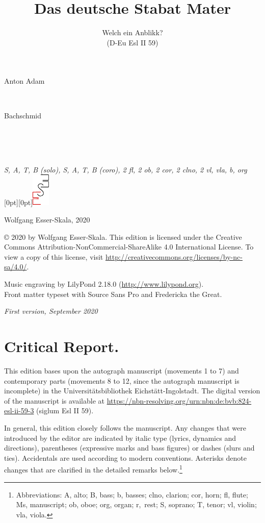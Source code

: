 \documentclass[parskip=full]{scrreprt}
\makeatletter
\DeclareRobustCommand{\sbseries}{\fontseries{sb}\selectfont}
\newcommand\fancytitlehead{
	\headingfont%
	\fontsize{80}{80}\selectfont\textcolor{black!80}{\@ifundefined{@shortname}{\@lastname}{\@shortname}.}\\[15pt]%
	\fontsize{60}{60}\selectfont\@ifundefined{@shorttitle}{\@title}{\@shorttitle}.%
}
\def\firstname#1{\def\@firstname{#1}}
\def\lastname#1{\def\@lastname{#1}}
\def\shorttitle#1{\def\@shorttitle{#1}}
\def\instrumentation#1{\def\@instrumentation{#1}}
\def\maketitle{%
\begin{titlepage}%
	\Large%
	{\@titlehead}%
	\vfill%
	{\strut\@firstname}\\%
	{\sbseries\color{oldred}\strut\@lastname}\\%
	{\strut\@namesuffix}%
	\vfill%
	{\sbseries\@title}\\%
	{\@subtitle}\\[\baselineskip]%
	{\itshape\@instrumentation}%
	\vfill%
	{\itshape\@parts}\hspace*{\fill}\raisebox{0pt}[0pt][0pt]{\includegraphics{ees_logo}}%
\end{titlepage}%
}
\newif\ifprintreport\printreportfalse
\makeatother
\begin{document}
\frenchspacing

\titlehead{\fancytitlehead}
\firstname{Anton Adam}
\lastname{Bachschmid}
\title{Das deutsche Stabat Mater}
\shorttitle{Stabat Mater}
\subtitle{Welch ein Anblikk?\\(D-Eu Esl II 59)}
\instrumentation{S, A, T, B (solo), S, A, T, B (coro), 2 fl, 2 ob, 2 cor, 2 clno, 2 vl, vla, b, org}
\maketitle


\thispagestyle{empty}

\vspace*{\fill}

\hspace*{1em}Wolfgang Esser-Skala, 2020

© 2020 by Wolfgang Esser-Skala. This edition is licensed under the Creative Commons Attribution-NonCommercial-ShareAlike 4.0 International License. To view a copy of this license, visit \url{http://creativecommons.org/licenses/by-nc-sa/4.0/}. 

Music engraving by LilyPond 2.18.0 (\url{http://www.lilypond.org}).\\
Front matter typeset with Source Sans Pro and Fredericka the Great.

\textit{First version, September 2020}

\vspace*{2cm}

\ifprintreport
\chapter*{Critical Report.}

This edition bases upon the autograph manuscript (movements 1 to 7) and contemporary parts (movements 8 to 12, since the autograph manuscript is incomplete) in the Universitätsbibliothek Eichstätt-Ingolstadt. The digital version of the manuscript is available at \url{https://nbn-resolving.org/urn:nbn:de:bvb:824-esl-ii-59-3} (siglum Esl II 59).

In general, this edition closely follows the manuscript. Any changes that were introduced by the editor are indicated by italic type (lyrics, dynamics and directions), parentheses (expressive marks and bass figures) or dashes (slurs and ties). Accidentals are used according to modern conventions. Asterisks denote changes that are clarified in the detailed remarks below.\footnote{Abbreviations: A, alto; B, bass; b, basses; clno, clarion; cor, horn; fl, flute; Ms, manuscript; ob, oboe; org, organ; r,~rest; S, soprano; T, tenor; vl, violin; vla, viola.}
\end{document}
